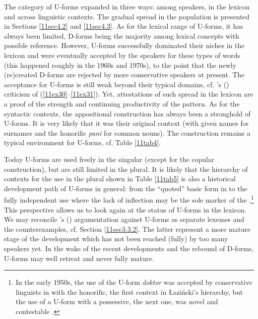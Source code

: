 \documentclass[output=paper,colorlinks,citecolor=brown]{langscibook}
\begin{document}
The category of U-forms expanded in three ways: among speakers, in the lexicon and across linguistic contexts. The gradual spread in the population is presented in Sections \ref{11sec4.2} and \ref{11sec4.3}. As for the lexical range of U-forms, it has always been limited, D-forms being the majority among lexical concepts with possible  reference. However, U-forms successfully dominated their niches in the lexicon and were eventually accepted by the speakers for these types of words (this happened roughly in the 1960s and 1970s), to the point that the newly (re)created D-forms are rejected by more conservative speakers at present. The acceptance for U-forms is still weak beyond their typical domains, cf. \citeauthor{szpyra-kozlowska2021}'s (\citeyear[336--341]{szpyra-kozlowska2021}) criticism of (\ref{11ex30}--\ref{11ex31}). Yet, attestations of such spread in the lexicon are a proof of the strength and continuing productivity of the pattern. As for the syntactic contexts, the appositional construction has always been a stronghold of U-forms. It is very likely that it was their original context (with given names for surnames and the honorific \emph{pani} for common nouns). The construction remains a typical environment for U-forms, cf. Table \ref{11tab4}.

Today U-forms are used freely in the singular (except for the copular construction), but are still limited in the plural. It is likely that the hierarchy of contexts for the use in the plural shown in Table \ref{11tab5} is also a historical development path of U-forms in general: from the ``quoted'' basic form in  to the fully independent use where the lack of inflection may be the sole marker of the  .\footnote{In the early 1950s, the use of the U-form \emph{doktor} was accepted by conservative linguists \citep[65]{pawlowski1951} in  with the honorific, the first context in Łaziński's hierarchy, but the use of a U-form with a  possessive, the next one, was novel and contestable \citep[32]{doroszewski1951}.} This perspective allows us to look again at the status of U-forms in the lexicon. We may reconcile \citeauthor{lazinski2006}'s (\citeyear[227]{lazinski2006}) argumentation against U-forms as separate lexemes and the counterexamples, cf. Section \ref{11sec3.3.2}. The latter represent a more mature stage of the development which has not been reached (fully) by too many speakers yet. In the wake of the recent developments and the rebound of D-forms, U-forms may well retreat and never fully mature.
\end{document}
